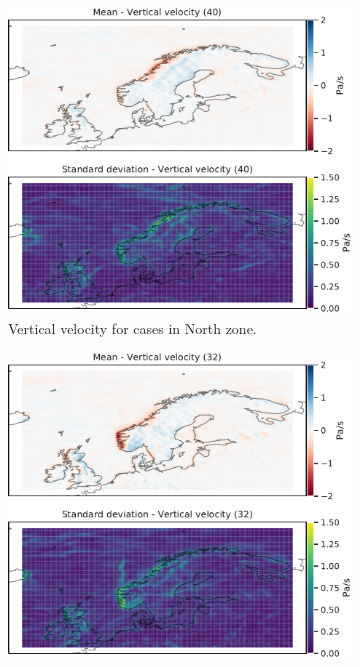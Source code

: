 \begin{figure}
\begin{subfigure}[b]{0.49\textwidth}
    \centering
    \includegraphics[width=\textwidth]{Figures/WNord.pdf}
    \caption{Vertical velocity for cases in North zone.}
    \label{fig:NordW}
\end{subfigure}
\begin{subfigure}[b]{0.49\textwidth}
    \centering
    \includegraphics[width=\textwidth]{Figures/WNordvest.pdf}

\end{subfigure}
\end{figure}
